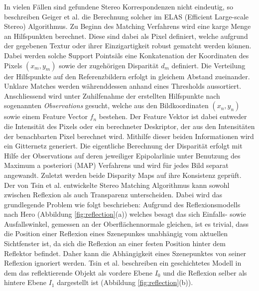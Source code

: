 \noindent
In vielen Fällen sind gefundene Stereo Korrespondenzen nicht eindeutig, so beschreiben Geiger et al. \cite{geiger2011efficient} die Berechnung solcher im ELAS (Efficient Large-scale Stereo) Algorithmus. Zu Beginn des Matching Verfahrens wird eine karge Menge an Hilfspunkten berechnet. Diese sind dabei als Pixel definiert, welche aufgrund der gegebenen Textur oder ihrer Einzigartigkeit robust gematcht werden können. Dabei werden solche \"Support Points\" als eine Kon­ka­te­na­ti­on der Koordinaten des Pixels $(x_m,y_m)$ sowie der zugehörigen Disparität $d_m$ definiert. Die Verteilung der Hilfspunkte auf den Referenzbildern erfolgt in gleichem Abstand zueinander. Unklare Matches werden währenddessen anhand eines Thresholds aussortiert. Anschliessend wird unter Zuhilfenahme der erstellten Hilfspunkte nach sogenannten \emph{Observations} gesucht, welche aus den Bildkoordinaten $(x_n,y_n)$ sowie einem Feature Vector $f_n$ bestehen. Der Feature Vektor ist dabei entweder die Intensität des Pixels oder ein berechneter Deskriptor, der aus den Intensitäten der benachbarten Pixel berechnet wird. Mithilfe dieser beiden Informationen wird ein Gitternetz generiert. Die eigentliche Berechnung der Disparität erfolgt mit Hilfe der Observations auf deren jeweiliger Epipolarlinie unter Benutzung des Maximum a posteriori (MAP) Verfahrens und wird für jedes Bild separat angewandt. Zuletzt werden beide Disparity Maps auf ihre Konsistenz geprüft.\\

\noindent
Der von Tsin et al. \cite{tsin2003stereo} entwickelte Stereo Matching Algorithmus kann sowohl zwischen Reflexion als auch Transparenz unterscheiden. Dabei wird das grundlegende Problem wie folgt beschrieben: Aufgrund des Reflexionsmodells nach Hero (Abbildung \ref{fig:reflection}(a)) welches besagt das sich Einfalls- sowie Ausfallswinkel, gemessen an der Oberflächennormale gleichen, ist es trivial, dass die Position einer Reflexion eines Szenepunkes unabhängig vom aktuellen Sichtfenster ist, da sich die Reflexion an einer festen Position hinter dem Reflektor befindet. Daher kann die Abhängigkeit eines Szenepunktes von seiner Reflexion ignoriert werden. Tsin et al. beschreiben ein geschichtetes Modell in dem das reflektierende Objekt als vordere Ebene $I_0$ und die Reflexion selber als hintere Ebene $I_1$ dargestellt ist (Abbildung \ref{fig:reflection}(b)).\\

